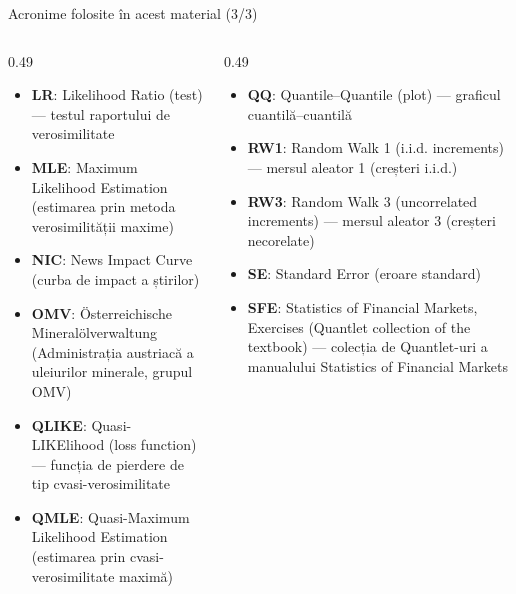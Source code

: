 \begin{frame}{Acronime folosite în acest material (3/3)}
\begin{columns}[T]
\begin{column}{0.49\textwidth}
\begin{itemize}\setlength{\itemsep}{0pt}
    \item \textbf{LR}: Likelihood Ratio (test) — testul raportului de verosimilitate
    \item \textbf{MLE}: Maximum Likelihood Estimation (estimarea prin metoda verosimilității maxime)
    \item \textbf{NIC}: News Impact Curve (curba de impact a știrilor)
    \item \textbf{OMV}: Österreichische Mineralölverwaltung (Administrația austriacă a uleiurilor minerale, grupul OMV)
    \item \textbf{QLIKE}: Quasi-LIKElihood (loss function) — funcția de pierdere de tip cvasi-verosimilitate
    \item \textbf{QMLE}: Quasi-Maximum Likelihood Estimation (estimarea prin cvasi-verosimilitate maximă)
\end{itemize}
\end{column}
\begin{column}{0.49\textwidth}
\begin{itemize}\setlength{\itemsep}{0pt}
    \item \textbf{QQ}: Quantile–Quantile (plot) — graficul cuantilă–cuantilă
    \item \textbf{RW1}: Random Walk 1 (i.i.d. increments) — mersul aleator 1 (creșteri i.i.d.)
    \item \textbf{RW3}: Random Walk 3 (uncorrelated increments) — mersul aleator 3 (creșteri necorelate)
    \item \textbf{SE}: Standard Error (eroare standard)
    \item \textbf{SFE}: Statistics of Financial Markets, Exercises (Quantlet collection of the textbook) — colecția de Quantlet-uri a manualului Statistics of Financial Markets
\end{itemize}
\end{column}
\end{columns}
\end{frame}


